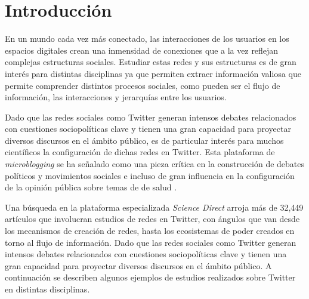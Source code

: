 \chapter{Introducción}
\label{sec:intro}



En un mundo cada vez más conectado, las interacciones de los usuarios en los espacios digitales crean una inmensidad de conexiones que a la vez reflejan complejas estructuras sociales. Estudiar estas redes y sus estructuras es de gran interés para distintas disciplinas ya que permiten extraer información valiosa que permite comprender distintos procesos sociales, como pueden ser el flujo de información, las interacciones y jerarquías entre los usuarios. 

Dado que las redes sociales como Twitter generan intensos debates relacionados con cuestiones sociopolíticas clave y tienen una gran capacidad para proyectar diversos discursos en el ámbito público, es de particular interés para muchos científicos la configuración de dichas redes en Twitter. Esta plataforma de \textit{ microblogging} se ha señalado como una pieza crítica en la construcción de debates políticos y movimientos sociales \cite{barbera_understanding_2015} e incluso de gran influencia en la configuración de la opinión pública sobre temas de de salud \cite{sharevski_misinformation_2022}.

Una búsqueda en la plataforma especializada \textit{Science Direct} arroja más de 32,449 artículos que involucran estudios de redes en Twitter, con ángulos que van desde los mecanismos de creación de redes, hasta los ecosistemas de poder creados en torno al flujo de información. Dado que las redes sociales como Twitter generan intensos debates relacionados con cuestiones sociopolíticas clave y tienen una gran capacidad para proyectar diversos discursos en el ámbito público. A continuación se describen algunos ejemplos de estudios realizados sobre Twitter en distintas disciplinas. 

